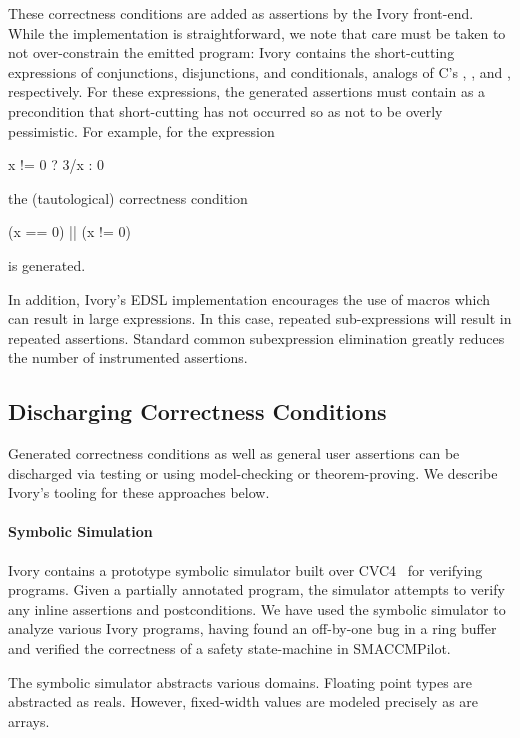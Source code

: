 These correctness conditions are added as assertions by the Ivory
front-end.  While the implementation is straightforward, we note that
care must be taken to not over-constrain the emitted program: 
 Ivory contains
the short-cutting expressions of conjunctions, disjunctions, and conditionals,
analogs of C's \cd{\&\&}, \cd{||}, and , respectively. For these
expressions, the generated assertions must contain as a precondition that
short-cutting has not occurred so as not to be overly pessimistic. For example,
for the expression
\noindent
\begin{code}
x != 0 ? 3/x : 0
\end{code}
\noindent
the (tautological) correctness condition
\begin{code}
(x == 0) || (x != 0)
\end{code}
\noindent
is generated.


In addition, Ivory's EDSL implementation encourages the use of macros
which can result in large expressions. In this case, repeated
sub-expressions will result in repeated assertions.  Standard common
subexpression elimination greatly reduces the number of
instrumented assertions.

\subsection{Discharging Correctness Conditions}

Generated correctness conditions as well as general user assertions can be
discharged via testing or using model-checking or theorem-proving. We describe
Ivory's tooling for these approaches below.

\paragraph{Symbolic Simulation}

Ivory contains a prototype symbolic simulator built over
CVC4~\cite{cvc4} for verifying programs.  Given a partially annotated
program, the simulator attempts to verify any inline assertions and
postconditions.  We have used the symbolic simulator to analyze
various Ivory programs, having found an off-by-one bug in a ring
buffer and verified the correctness of a safety state-machine in
SMACCMPilot.

The symbolic simulator abstracts various domains. Floating point types
are abstracted as reals. However, fixed-width values are modeled
precisely as are arrays.

